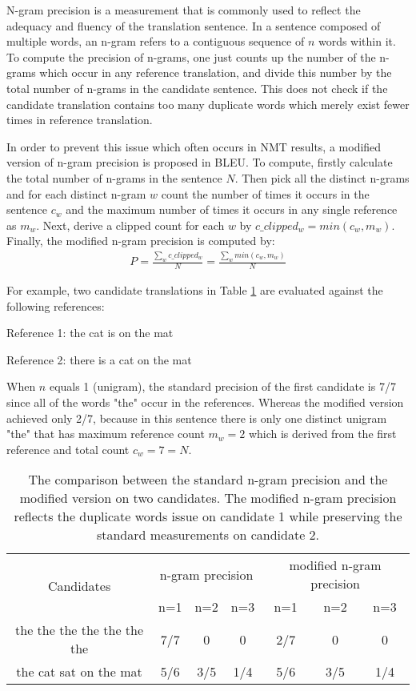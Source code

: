N-gram precision is a measurement that is commonly used to reflect the adequacy and fluency of the translation sentence. In a sentence composed of multiple words, an n-gram refers to a contiguous sequence of $ n $ words within it. To compute the precision of n-grams, one just counts up the number of the n-grams which occur in any reference translation, and divide this number by the total number of n-grams in the candidate sentence. This does not check if the candidate translation contains too many duplicate words which merely exist fewer times in reference translation. 

In order to prevent this issue which often occurs in NMT results, a modified version of n-gram precision is proposed in BLEU. To compute, firstly calculate the total number of n-grams in the sentence $ N $. Then pick all the distinct n-grams and for each distinct n-gram $ w $ count the number of times it occurs in the sentence $ c_{w} $ and the maximum number of times it occurs in any single reference as $ m_{w} $. Next, derive a clipped count for each $ w $ by $ c\_clipped_{w} = min(c_{w},m_{w}) $. Finally, the modified n-gram precision is computed by:
\begin{align*}
P = \frac{\sum_{w}c\_clipped_{w}}{N} = \frac{\sum_{w}min(c_{w},m_{w})}{N}
\end{align*}

For example, two candidate translations in Table \ref{table:modified n-gram} are evaluated against the following references:

Reference 1: the cat is on the mat

Reference 2: there is a cat on the mat

When $ n $ equals 1 (unigram), the standard precision of the first candidate is 7/7 since all of the words "the" occur in the references. Whereas the modified version achieved only 2/7, because in this sentence there is only one distinct unigram "the" that has maximum reference count $ m_{w} = 2 $ which is derived from the first reference and total count $ c_{w} = 7 = N $.

\begin{table}[h]
\label{table:modified n-gram}
\centering
\caption{The comparison between the standard n-gram precision and the modified version on two candidates. The modified n-gram precision reflects the duplicate words issue on candidate 1 while preserving the standard measurements on candidate 2.}
\begin{tabular}{c|ccc|ccc}
\multirow{2}{*}{ Candidates } & \multicolumn{3}{c|}{ n-gram precision } & \multicolumn{3}{c}{ modified n-gram precision } \\
\cline{2-7}
& n=1 & n=2 & n=3 & n=1 & n=2 & n=3 \\
\hline
the the the the the the the & 7/7 & 0 & 0 & 2/7 & 0 & 0 \\
\hline
the cat sat on the mat & 5/6 & 3/5 & 1/4 & 5/6 & 3/5 & 1/4 \\
\end{tabular}
\end{table}

